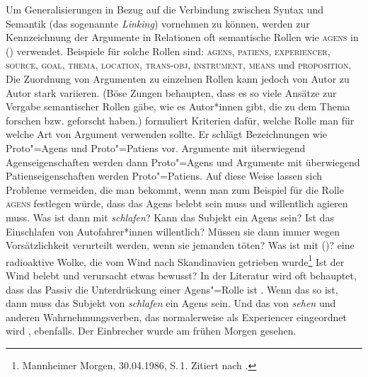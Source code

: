 Um Generalisierungen in Bezug auf die Verbindung zwischen Syntax und Semantik (das sogenannte
\emph{Linking}) vornehmen zu können, werden zur Kennzeichnung der Argumente
in Relationen oft semantische Rollen \citep{Fillmore68,Fillmore77,Kunze91} wie
\textsc{agens} in () verwendet. Beispiele für solche Rollen sind: 
\textsc{agens}, 
\textsc{patiens}, 
\textsc{experiencer}, 
\textsc{source}, 
\textsc{goal}, 
\textsc{thema}, 
\textsc{location}, 
\textsc{trans-obj}, 
\textsc{instrument}, 
\textsc{means} und 
\textsc{proposition}.
Die Zuordnung von Argumenten zu einzelnen Rollen kann jedoch von Autor zu Autor stark
variieren. (Böse Zungen behaupten, dass es so viele Ansätze zur Vergabe semantischer Rollen gäbe,
wie es Autor*innen gibt, die zu dem Thema forschen bzw. geforscht haben.)
\citet{Dowty91a} formuliert Kriterien dafür, welche Rolle man für welche Art von Argument
verwenden sollte. Er schlägt Bezeichnungen wie Proto"=Agens und Proto"=Patiens vor. Argumente mit
überwiegend Agenseigenschaften werden dann Proto"=Agens und Argumente mit überwiegend Patienseigenschaften
werden Proto"=Patiens. Auf diese Weise lassen sich Probleme vermeiden, die man bekommt, wenn man zum
Beispiel für die Rolle \textsc{agens} festlegen würde, dass das Agens belebt sein muss und
willentlich agieren muss. Was ist dann mit \emph{schlafen}? Kann das Subjekt ein Agens sein? Ist das
Einschlafen von Autofahrer*innen willentlich? Müssen sie dann immer wegen Vorsätzlichkeit verurteilt
werden, wenn sie jemanden töten? Was ist mit ()? 
\ea
eine radioaktive Wolke, die vom Wind nach Skandinavien getrieben wurde\footnote{
  Mannheimer Morgen, 30.04.1986, S.\,1. Zitiert nach .
}
\z
Ist der Wind belebt und verursacht etwas bewusst? In der Literatur wird oft
behauptet, dass das Passiv die Unterdrückung einer Agens"=Rolle ist \parencites[]{Haider86}[300]{Wunderlich87c}. Wenn das so ist, dann muss das
Subjekt von \emph{schlafen} ein Agens sein. Und das von \emph{sehen} und anderen Wahrnehmungsverben, das normalerweise als
Experiencer eingeordnet wird \parencites[]{Devlin92}[]{Dowty2000a}, ebenfalls.
\ea
Der Einbrecher wurde am frühen Morgen gesehen.
\z

